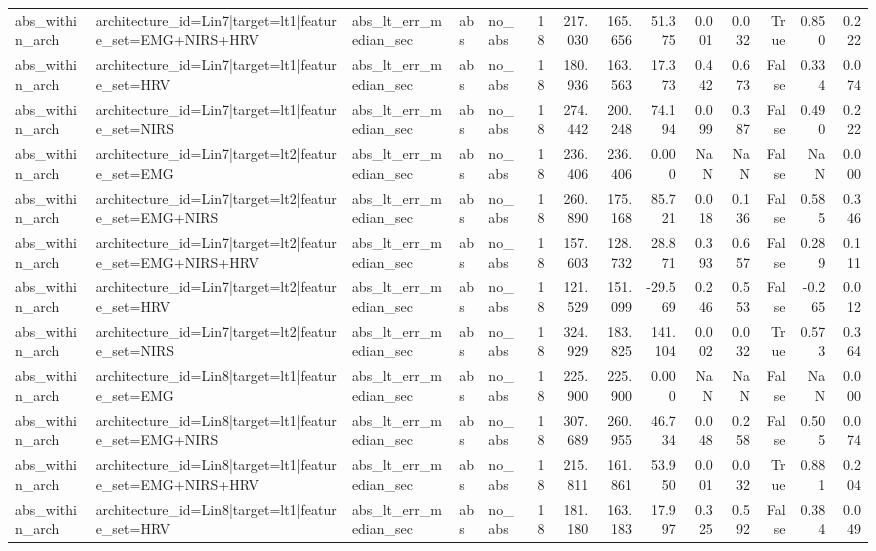 \begin{table}
\begin{tabular}{lllllrrrrrrrrr}
abs_within_arch & architecture_id=Lin7|target=lt1|feature_set=EMG+NIRS+HRV & abs_lt_err_median_sec & abs & no_abs & 18 & 217.030 & 165.656 & 51.375 & 0.001 & 0.032 & True & 0.850 & 0.222 \\
abs_within_arch & architecture_id=Lin7|target=lt1|feature_set=HRV & abs_lt_err_median_sec & abs & no_abs & 18 & 180.936 & 163.563 & 17.373 & 0.442 & 0.673 & False & 0.334 & 0.074 \\
abs_within_arch & architecture_id=Lin7|target=lt1|feature_set=NIRS & abs_lt_err_median_sec & abs & no_abs & 18 & 274.442 & 200.248 & 74.194 & 0.099 & 0.387 & False & 0.490 & 0.222 \\
abs_within_arch & architecture_id=Lin7|target=lt2|feature_set=EMG & abs_lt_err_median_sec & abs & no_abs & 18 & 236.406 & 236.406 & 0.000 & NaN & NaN & False & NaN & 0.000 \\
abs_within_arch & architecture_id=Lin7|target=lt2|feature_set=EMG+NIRS & abs_lt_err_median_sec & abs & no_abs & 18 & 260.890 & 175.168 & 85.721 & 0.018 & 0.136 & False & 0.585 & 0.346 \\
abs_within_arch & architecture_id=Lin7|target=lt2|feature_set=EMG+NIRS+HRV & abs_lt_err_median_sec & abs & no_abs & 18 & 157.603 & 128.732 & 28.871 & 0.393 & 0.657 & False & 0.289 & 0.111 \\
abs_within_arch & architecture_id=Lin7|target=lt2|feature_set=HRV & abs_lt_err_median_sec & abs & no_abs & 18 & 121.529 & 151.099 & -29.569 & 0.246 & 0.553 & False & -0.265 & 0.012 \\
abs_within_arch & architecture_id=Lin7|target=lt2|feature_set=NIRS & abs_lt_err_median_sec & abs & no_abs & 18 & 324.929 & 183.825 & 141.104 & 0.002 & 0.032 & True & 0.573 & 0.364 \\
abs_within_arch & architecture_id=Lin8|target=lt1|feature_set=EMG & abs_lt_err_median_sec & abs & no_abs & 18 & 225.900 & 225.900 & 0.000 & NaN & NaN & False & NaN & 0.000 \\
abs_within_arch & architecture_id=Lin8|target=lt1|feature_set=EMG+NIRS & abs_lt_err_median_sec & abs & no_abs & 18 & 307.689 & 260.955 & 46.734 & 0.048 & 0.258 & False & 0.505 & 0.074 \\
abs_within_arch & architecture_id=Lin8|target=lt1|feature_set=EMG+NIRS+HRV & abs_lt_err_median_sec & abs & no_abs & 18 & 215.811 & 161.861 & 53.950 & 0.001 & 0.032 & True & 0.881 & 0.204 \\
abs_within_arch & architecture_id=Lin8|target=lt1|feature_set=HRV & abs_lt_err_median_sec & abs & no_abs & 18 & 181.180 & 163.183 & 17.997 & 0.325 & 0.592 & False & 0.384 & 0.049 \\

\end{tabular}
\end{table}
